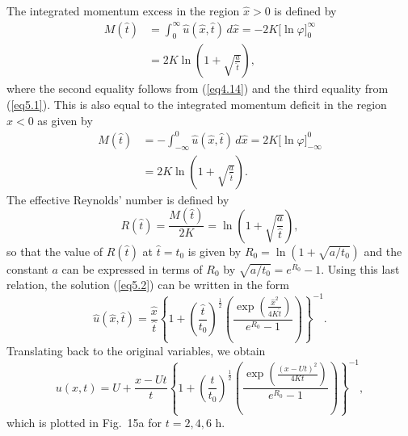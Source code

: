 \documentclass[10pt]{article}
\begin{document}
     The integrated momentum excess in the region $\hat{x}>0$ is defined by
\begin{equation}                                 %
  \begin{split}
     M(\hat{t}) &= \int_0^\infty \hat{u}(\hat{x},\hat{t}) \, d\hat{x}
	         = -2K\bigl[\ln\varphi\bigr]_0^\infty  \\
	        &= 2K\ln\left(1+\sqrt{\frac{a}{\hat{t}}}\right),
  \end{split}
\label{eq5.3}
\end{equation}
where the second equality follows from (\ref{eq4.14}) and the third
equality from (\ref{eq5.1}). This is also equal to the integrated momentum deficit
in the region $\hat{x}<0$ as given by
\begin{equation}                                 %
  \begin{split}
     M(\hat{t}) &= -\int_{-\infty}^0 \hat{u}(\hat{x},\hat{t}) \, d\hat{x}
	         = 2K\bigl[\ln\varphi\bigr]_{-\infty}^0  \\
	        &= 2K\ln\left(1+\sqrt{\frac{a}{\hat{t}}}\right).
  \end{split}
\label{eq5.4}
\end{equation}
The effective Reynolds' number is defined by
\begin{equation}                                 %
     R(\hat{t}) = \frac{M(\hat{t})}{2K} = \ln\left(1+\sqrt{\frac{a}{\hat{t}}}\right),
\label{eq5.5}
\end{equation}
so that the value of $R(\hat{t})$ at $\hat{t}=t_0$ is given by
$R_0 = \ln\left(1+\sqrt{a/t_0}\right)$ and the constant $a$
can be expressed in terms of $R_0$ by $\sqrt{a/t_0} = e^{R_0} - 1$.
Using this last relation, the solution (\ref{eq5.2}) can be written in
the form
\begin{equation}                                 %
   \hat{u}(\hat{x},\hat{t}) = \frac{\hat{x}}{\hat{t}}
     \left\{1 + \left(\frac{\hat{t}}{t_0}\right)^{\frac{1}{2}}
     \left(\frac{\exp\left(\frac{\hat{x}^2}{4K\hat{t}}\right)}{e^{R_0}-1}\right)\right\}^{-1}.
\label{eq5.6}
\end{equation}
Translating back to the original variables, we obtain
\begin{equation}                                 %
     u(x,t) = U + \frac{x-Ut}{t}
       \left\{1 + \left(\frac{t}{t_0}\right)^{\frac{1}{2}}
       \left(\frac{\exp\left(\frac{(x-Ut)^2}{4Kt}\right)}{e^{R_0} - 1}\right)\right\}^{-1},
\label{eq5.7}
\end{equation}
which is plotted in Fig.~15a for $t=2,4,6$ h.
\end{document}
